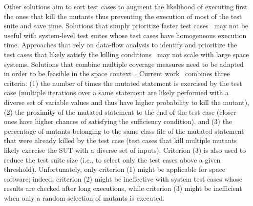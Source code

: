 Other solutions aim to sort test cases to augment the likelihood of executing first the ones that kill the mutants thus preventing the execution of most of the test suite and save time.
Solutions that simply prioritize faster test cases~\cite{just2012using}
 may not be useful with system-level test suites whose test cases have homogeneous execution time.
Approaches that rely on data-flow analysis to identify and prioritize the test cases that likely satisfy the killing conditions~\cite{papadakis2011automatically} may not scale with large space systems.
Solutions that combine multiple coverage measures need to be adapted in order
to be feasible in the space context~\cite{zhang2013faster}.
Current work~\cite{zhang2013faster} combines three criteria: (1) the number of times the mutated statement is exercised by the test case (multiple iterations over a same statement are likely performed with a diverse set of variable values and thus have higher probability to kill the mutant), (2) the proximity of the mutated statement to the end of the test case (closer ones have higher chances of satisfying the sufficiency condition), and (3) the percentage of mutants belonging to the same class file of the mutated statement that were already killed by the test case (test cases that kill multiple mutants likely exercise the SUT with a diverse set of inputs).
Criterion (3) is also used to reduce the test suite size (i.e., to select only the test cases above a given threshold).
Unfortunately, only criterion (1) might be applicable for space software; indeed, criterion (2) might be ineffective with system test cases whose results are checked after long executions, while criterion (3) might be inefficient when only a random selection of mutants is executed.






%
%
%




